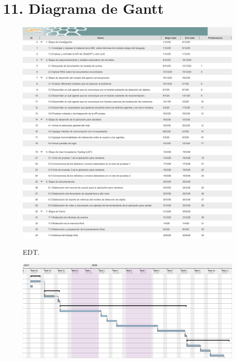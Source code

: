 \documentclass[
11pt, %
]{charter}
\begin{document}
\section{11. Diagrama de Gantt}
\label{sec:gantt}

\begin{figure}[H]
\centering 
\includegraphics[width=1\textwidth]{./Figuras/gantt_1_1.png}\\[0.5em]
\includegraphics[width=1\textwidth]{./Figuras/gantt_1_2.png}
\caption{EDT.}
\label{fig:AoN}
\end{figure}

\newpage
\begin{landscape}
\begin{figure}[H]
\centering 
\includegraphics[width=1.55\textwidth]{./Figuras/gantt_2_1.png}
\label{fig:Gantt 2.1}
\end{figure}
\end{landscape}
\end{document}
